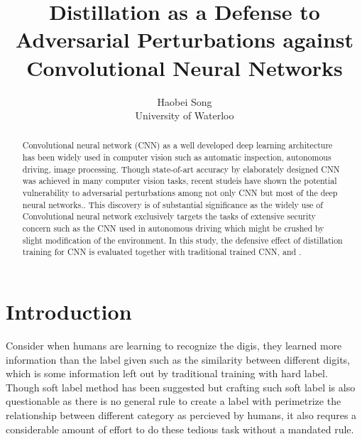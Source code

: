 \documentclass{article}
\title{Distillation as a Defense to Adversarial Perturbations against Convolutional Neural Networks}
\author{Haobei Song \\
        University of Waterloo}
\begin{document}
\maketitle
{}
\newpage
{}

\begin{abstract}
	Convolutional neural network (CNN) as a well developed deep learning architecture has been widely used in computer vision such as automatic inspection, autonomous driving, image processing. 
	Though state-of-art accuracy by elaborately designed CNN was achieved in many computer vision tasks, 
	recent studeis have shown the potential vulnerability to adversarial perturbations among not only CNN but most of the deep neural networks..
	This discovery is of substantial significance as the widely use of Convolutional neural network exclusively targets the tasks of extensive security concern
	such as the CNN used in autonomous driving which might be crushed by slight modification of the environment. 
	In this study, the defensive effect of distillation training for CNN is evaluated together with traditional trained CNN, and .
\end{abstract}
\section{Introduction}
Consider when humans are learning to recognize the digis, they learned more information than the label given such as the similarity between different digits, which is some information left out by traditional training with hard label. Though soft label method has been suggested but crafting such soft label is also questionable as there is no general rule to create a label with perimetrize the relationship between different category as percieved by humans, it also requres a considerable amount of effort to do these tedious task without a mandated rule.
\end{document}
